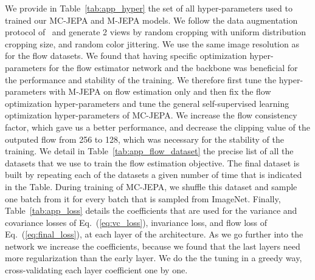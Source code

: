 We provide in Table~\ref{tab:app_hyper} the set of all hyper-parameters used to trained our MC-JEPA and M-JEPA models. We follow the data augmentation protocol of~\cite{bardes2022vicreg} and generate 2 views by random cropping with uniform distribution cropping size, and random color jittering. We use the same image resolution as~\cite{teed2020raft} for the flow datasets. We found that having specific optimization hyper-parameters for the flow estimator network and the backbone was beneficial for the performance and stability of the training. We therefore first tune the hyper-parameters with M-JEPA on flow estimation only and then fix the flow optimization hyper-parameters and tune the general self-supervised learning optimization hyper-parameters of MC-JEPA. We increase the flow consistency factor, which gave us a better performance, and decrease the clipping value of the outputed flow from 256 to 128, which was necessary for the stability of the training. We detail in Table~\ref{tab:app_flow_dataset} the precise list of all the datasets that we use to train the flow estimation objective. The final dataset is built by repeating each of the datasets a given number of time that is indicated in the Table. During training of MC-JEPA, we shuffle this dataset and sample one batch from it for every batch that is sampled from ImageNet. Finally, Table~\ref{tab:app_loss} details the coefficients that are used for the variance and covariance losses of Eq.~(\ref{eq:vc_loss}), invariance loss, and flow loss of Eq.~(\ref{eq:final_loss}), at each layer of the architecture. As we go further into the network we increase the coefficients, because we found that the last layers need more regularization than the early layer. We do the the tuning in a greedy way, cross-validating each layer coefficient one by one.

